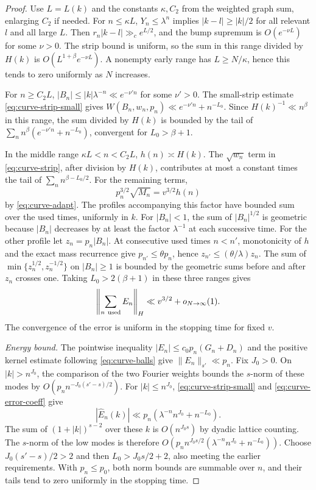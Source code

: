 \documentclass[11pt,a4paper,reqno]{amsart}
\theoremstyle{definition}
\theoremstyle{remark}
\numberwithin{equation}{section}
\begin{document}
\begin{proof}
Use \(L=L(k)\) and the constants \(\kappa,C_2\) from the weighted
graph sum, enlarging \(C_2\) if needed. For \(n\le\kappa L\),
\(Y_n\le\lambda^n\) implies \(|k-l|\ge|k|/2\) for all relevant \(l\)
and all large \(L\). Then \(r_n|k-l|\gg_c e^{L/2}\), and the bump
supremum is \(O(e^{-\nu L})\) for some \(\nu>0\). The strip bound
is uniform, so the sum in this range divided by \(H(k)\) is
\(O(L^{1+\beta}e^{-\nu L})\). A nonempty early range has
\(L\ge N/\kappa\), hence this tends to zero uniformly as \(N\) increases.

For \(n\ge C_2 L\), \(|B_n|\le |k|\lambda^{-n}\ll e^{-\nu' n}\)
for some \(\nu'>0\). The small-strip estimate
\eqref{eq:curve-strip-small} gives
\(W(B_n,w_n,p_n)\ll e^{-\nu'n}+n^{-L_0}\). Since \(H(k)^{-1}\ll n^\beta\)
in this range, the sum divided by \(H(k)\) is bounded by the tail of
\(\sum_n n^\beta(e^{-\nu'n}+n^{-L_0})\), convergent for
\(L_0>\beta+1\).

In the middle range \(\kappa L<n<C_2 L\), \(h(n)\asymp H(k)\).
The \(\sqrt{w_n}\) term in \eqref{eq:curve-strip}, after division by
\(H(k)\), contributes at most a constant times the tail of
\(\sum_n n^{\beta-L_0/2}\). For the remaining terms,
\[
                   p_n^{3/2}\sqrt{M_n}=v^{3/2}h(n)
\]
by \eqref{eq:curve-adapt}. The profiles accompanying this factor have
bounded sum over the used times, uniformly in \(k\). For \(|B_n|<1\),
the sum of \(|B_n|^{1/2}\) is geometric because \(|B_n|\) decreases
by at least the factor \(\lambda^{-1}\) at each successive time.
For the other profile let \(z_n=p_n|B_n|\). At consecutive used
times \(n<n'\), monotonicity of \(h\) and the exact mass recurrence
give \(p_{n'}\le\theta p_n\), hence \(z_{n'}\le(\theta/\lambda)z_n\).
The sum of \(\min\{z_n^{1/2},z_n^{-1/2}\}\) on \(|B_n|\ge1\) is
bounded by the geometric sums before and after \(z_n\) crosses one.
Taking \(L_0>2(\beta+1)\) in these three ranges gives
\begin{equation}\label{eq:curve-error-H}
              \left\|\sum_{n\ {\rm used}}E_n\right\|_H
                 \ll v^{3/2}+o_{N\to\infty}(1).
\end{equation}
The convergence of the error is uniform in the stopping time for
fixed \(v\).

\medskip
\noindent\emph{Energy bound.}
The pointwise inequality \(|E_n|\le c_0p_n(G_n+D_n)\) and the
positive kernel estimate following \eqref{eq:curve-balls} give
\(\|E_n\|_{s'}\ll p_n\). Fix \(J_0>0\). On \(|k|>n^{J_0}\), the
comparison of the two Fourier weights bounds the \(s\)-norm of these
modes by \(O(p_n n^{-J_0(s'-s)/2})\). For \(|k|\le n^{J_0}\),
\eqref{eq:curve-strip-small} and \eqref{eq:curve-error-coeff} give
\[
           |\widehat E_n(k)|\ll
              p_n(\lambda^{-n}n^{J_0}+n^{-L_0}).
\]
The sum of \((1+|k|)^{s-2}\) over these \(k\) is \(O(n^{J_0s})\)
by dyadic lattice counting. The \(s\)-norm of the low modes is
therefore \(O(p_n n^{J_0s/2}(\lambda^{-n}n^{J_0}+n^{-L_0}))\).
Choose \(J_0(s'-s)/2>2\) and then \(L_0>J_0s/2+2\), also meeting
the earlier requirements. With \(p_n\le p_0\), both norm bounds
are summable over \(n\), and their tails tend to zero uniformly in
the stopping time.


\end{proof}
\end{document}
